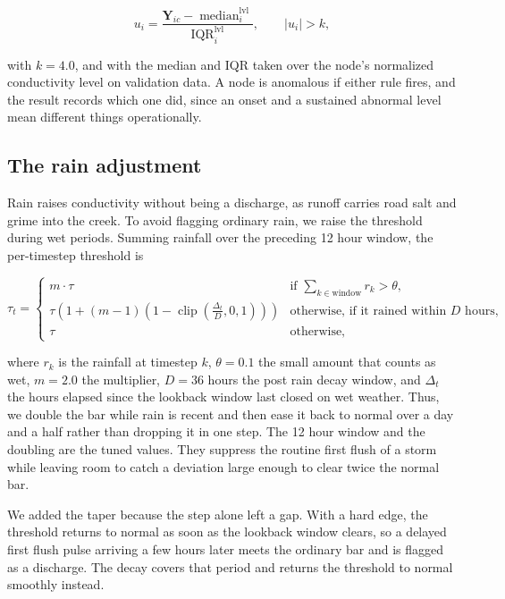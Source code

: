\documentclass{article}
\begin{document}
\begin{equation}
  \label{eq:level-shift}
  u_i = \frac{\mathbf{Y}_{ic} - \operatorname{median}^{\text{lvl}}_i}{\operatorname{IQR}^{\text{lvl}}_i}, \qquad \lvert u_i \rvert > k,
\end{equation}

with $k = 4.0$, and with the median and IQR taken over the node's normalized
conductivity level on validation data. A node is anomalous if either rule
fires, and the result records which one did, since an onset and a sustained
abnormal level mean different things operationally.

\subsection{The rain adjustment}
\label{sec:rain}

Rain raises conductivity without being a discharge, as runoff carries road salt
and grime into the creek. To avoid flagging ordinary rain, we raise the
threshold during wet periods. Summing rainfall over the preceding 12 hour
window, the per-timestep threshold is

\begin{equation}
  \label{eq:rain}
  \tau_t =
  \begin{cases}
    m \cdot \tau & \text{if } \sum_{k \in \text{window}} r_k > \theta, \\[4pt]
    \tau \left( 1 + (m - 1)\left(1 - \operatorname{clip}\!\left(\frac{\Delta_t}{D}, 0, 1\right)\right) \right) & \text{otherwise, if it rained within } D \text{ hours},\\[4pt]
    \tau & \text{otherwise,}
  \end{cases}
\end{equation}

where $r_k$ is the rainfall at timestep $k$, $\theta = 0.1$ the small amount that
counts as wet, $m = 2.0$ the multiplier, $D = 36$ hours the post rain decay
window, and $\Delta_t$ the hours elapsed since the lookback window last closed
on wet weather. Thus, we double the bar while rain is recent and then ease it
back to normal over a day and a half rather than dropping it in one step. The
12 hour window and the doubling are the tuned values. They suppress the
routine first flush of a storm while leaving room to catch a deviation large
enough to clear twice the normal bar.

We added the taper because the step alone left a gap. With a hard edge, the
threshold returns to normal as soon as the lookback window clears, so a delayed
first flush pulse arriving a few hours later meets the ordinary bar and is
flagged as a discharge. The decay covers that period and returns the threshold
to normal smoothly instead.
\end{document}
